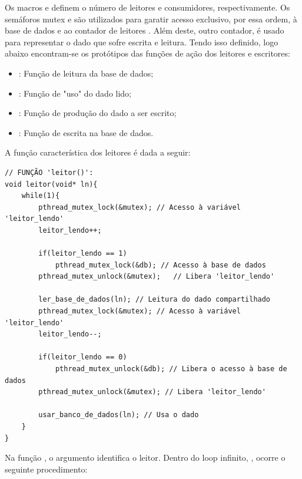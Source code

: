 \documentclass[
	12pt,				%
	openright,			%
	oneside,			%
	a4paper,			%
	chapter=TITLE,		%
	english,			%
	french,				%
	spanish,			%
	brazil				%
	]{abntex2}
\theoremstyle{definition}
\begin{document}
Os macros  e  definem o número de leitores e consumidores, respectivamente. Os semáforos mutex  e  são utilizados para garatir acesso exclusivo, por essa ordem, à base de dados e ao contador de leitores . Além deste, outro contador,  é usado para representar o dado que sofre escrita e leitura. Tendo isso definido, logo abaixo encontram-se os protótipos das funções de ação dos leitores e escritores:

\begin{itemize}
    \item \textbf{}: Função de leitura da base de dados;
    \item \textbf{}: Função de "uso" do dado lido;
    \item \textbf{}: Função de produção do dado a ser escrito;
    \item \textbf{}: Função de escrita na base de dados.
\end{itemize}

\newpage

A função característica dos leitores é dada a seguir:

\begin{verbatim}
// FUNÇÃO 'leitor()':
void leitor(void* ln){
    while(1){
        pthread_mutex_lock(&mutex); // Acesso à variável 'leitor_lendo'
        leitor_lendo++;

        if(leitor_lendo == 1) 
            pthread_mutex_lock(&db); // Acesso à base de dados
        pthread_mutex_unlock(&mutex);   // Libera 'leitor_lendo'

        ler_base_de_dados(ln); // Leitura do dado compartilhado
        pthread_mutex_lock(&mutex); // Acesso à variável 'leitor_lendo'
        leitor_lendo--; 

        if(leitor_lendo == 0) 
            pthread_mutex_unlock(&db); // Libera o acesso à base de dados
        pthread_mutex_unlock(&mutex); // Libera 'leitor_lendo'
        
        usar_banco_de_dados(ln); // Usa o dado
    }
}
\end{verbatim}

Na função , o argumento  identifica o leitor. Dentro do loop infinito, , ocorre o seguinte procedimento:
\end{document}
